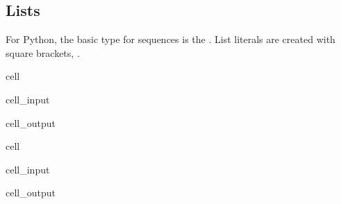 \documentclass[letterpaper,10pt,english]{jupyterBook}
\begin{document}
\subsection{Lists}
\label{\detokenize{datatypes:lists}}
\sphinxAtStartPar
For Python, the basic type for sequences is the .
List literals are created with square brackets, \sphinxcode{\sphinxupquote{{[}{]}}}.

\begin{sphinxuseclass}{cell}\begin{sphinxVerbatimInput}

\begin{sphinxuseclass}{cell_input}
\begin{sphinxVerbatim}[commandchars=\\\{\}]
\PYG{p}{[}\PYG{p}{]}
\end{sphinxVerbatim}

\end{sphinxuseclass}\end{sphinxVerbatimInput}
\begin{sphinxVerbatimOutput}

\begin{sphinxuseclass}{cell_output}
\begin{sphinxVerbatim}
\end{sphinxVerbatim}

\end{sphinxuseclass}\end{sphinxVerbatimOutput}

\end{sphinxuseclass}
\begin{sphinxuseclass}{cell}\begin{sphinxVerbatimInput}

\begin{sphinxuseclass}{cell_input}
\begin{sphinxVerbatim}[commandchars=\\\{\}]
\PYG{p}{[}\PYG{p}{]}
\end{sphinxVerbatim}

\end{sphinxuseclass}\end{sphinxVerbatimInput}
\begin{sphinxVerbatimOutput}

\begin{sphinxuseclass}{cell_output}
\begin{sphinxVerbatim}[commandchars=\\\{\}]
[5, 0]
\end{sphinxVerbatim}

\end{sphinxuseclass}\end{sphinxVerbatimOutput}

\end{sphinxuseclass}
\end{document}
